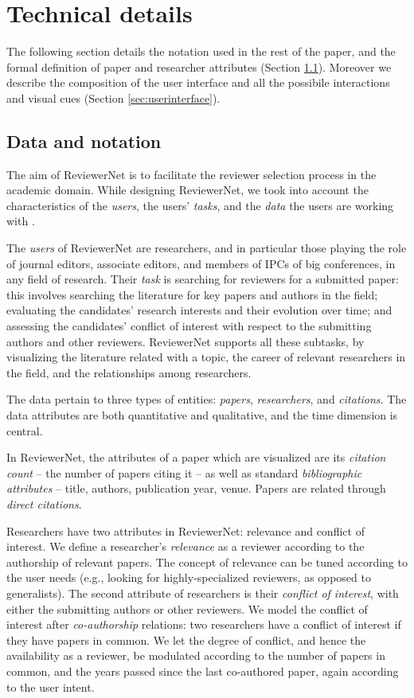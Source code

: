 \chapter{Technical details}
\label{sec:platform}

The following section details the notation used in the rest of the paper, and the formal definition of paper and researcher attributes (Section \ref{sec:methods}). Moreover we describe the composition of the user interface and all the possibile interactions and visual cues (Section \ref{sec:userinterface}).
\section{Data and notation}
\label{sec:methods} %

The aim of ReviewerNet is to facilitate the reviewer selection process in the academic domain. While designing ReviewerNet, we took into account the characteristics of the \emph{users}, the users' \emph{tasks}, and the \emph{data} the users are working with \cite{MiAi14}. 

The \emph{users} of ReviewerNet are researchers, and in particular those playing the role of journal editors, associate editors, and members of IPCs of big conferences, in any field of research. Their \emph{task} is searching for reviewers for a submitted paper: this involves searching the literature for key papers and authors in the field; evaluating the candidates' research interests and their evolution over time; and assessing the candidates' conflict of interest with respect to the submitting authors and other reviewers. ReviewerNet supports all these subtasks, by visualizing the literature related with a topic, the career of relevant researchers in the field, and the relationships among researchers. 

The data pertain to three types of entities: \emph{papers}, \emph{researchers}, and \emph{citations}. The data attributes are both quantitative and qualitative, and the time dimension is central. 

In ReviewerNet, the attributes of a paper which are visualized are its \emph{citation count} -- the number of papers citing it -- as well as standard \emph{bibliographic attributes} -- title, authors, publication year, venue. Papers are related through \emph{direct citations}. 

Researchers have two attributes in ReviewerNet: relevance and conflict of interest. We define a researcher's \emph{relevance} as a reviewer according to the authorship of relevant papers. The concept of relevance can be tuned according to the user needs (e.g., looking for highly-specialized reviewers, as opposed to generalists). The second attribute of researchers is their \emph{conflict of interest}, with either the submitting authors or other reviewers. We model the conflict of interest after \emph{co-authorship} relations: two researchers have a conflict of interest if they have papers in common. We let the degree of conflict, and hence the availability as a reviewer, be modulated according to the number of papers in common, and the years passed since the last co-authored paper, again according to the user intent. 

